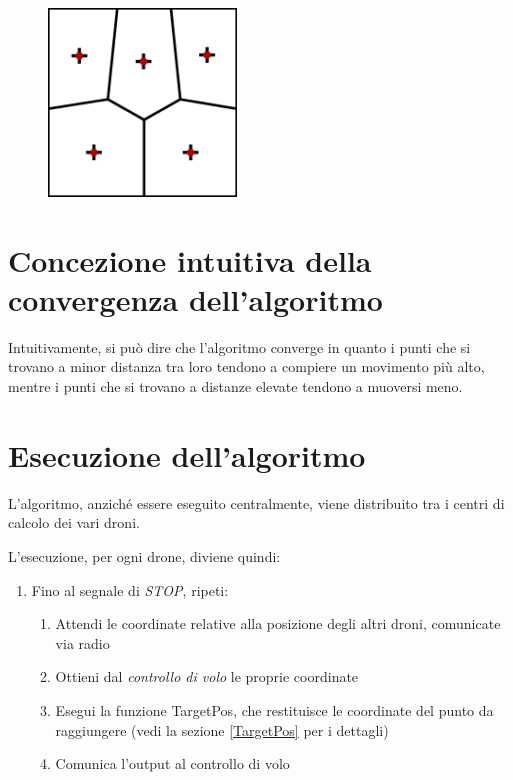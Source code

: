 \documentclass[11pt,a4paper]{report}
\newcommand{\name}[1]{{\ttfamily #1}}
\begin{document}
\begin{figure}[H]
\includegraphics[width=5cm]{lloyd_iterazione_4.png}
\centering
\end{figure}

\section{Concezione intuitiva della convergenza dell'algoritmo}

Intuitivamente, si può dire che l'algoritmo converge in quanto i punti che si trovano a minor distanza tra loro tendono a compiere un movimento più alto, mentre i punti che si trovano a distanze elevate tendono a muoversi meno.

\section{Esecuzione dell'algoritmo}

L'algoritmo, anziché essere eseguito centralmente, viene distribuito tra i centri di calcolo dei vari droni.

L'esecuzione, per ogni drone, diviene quindi:

\begin{enumerate}
	\item Fino al segnale di \textit{STOP}, ripeti:
	\begin{enumerate}
		\item Attendi le coordinate relative alla posizione degli altri droni, comunicate via radio
		\item Ottieni dal \textit{controllo di volo} le proprie coordinate
		\item Esegui la funzione \name{TargetPos}, che restituisce le coordinate del punto da raggiungere (vedi la sezione \ref{TargetPos} per i dettagli)
		\item Comunica l'output al controllo di volo
	\end{enumerate}
\end{enumerate}
\end{document}
